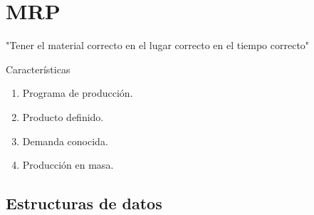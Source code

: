 \section{MRP}

"Tener el material correcto en el lugar correcto en el tiempo correcto"

Características 

\begin{enumerate}
    \item Programa de producción.
    \item Producto definido.
    \item Demanda conocida.
    \item Producción en masa. 
\end{enumerate}

\subsection{Estructuras de datos}

